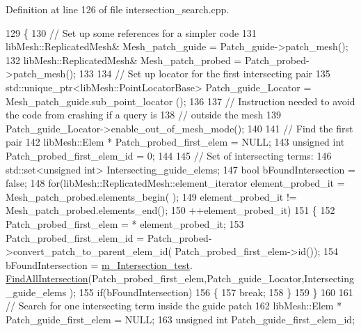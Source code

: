 Definition at line 126 of file intersection\+\_\+search.\+cpp.


\begin{DoxyCode}
129     \{
130         \textcolor{comment}{// Set up some references for a simpler code}
131         libMesh::ReplicatedMesh&    Mesh\_patch\_guide    = Patch\_guide->patch\_mesh();
132         libMesh::ReplicatedMesh&        Mesh\_patch\_probed   = Patch\_probed->patch\_mesh();
133 
134         \textcolor{comment}{// Set up locator for the first intersecting pair}
135         std::unique\_ptr<libMesh::PointLocatorBase> Patch\_guide\_Locator = Mesh\_patch\_guide.sub\_point\_locator
      ();
136 
137         \textcolor{comment}{// Instruction needed to avoid the code from crashing if a query is}
138         \textcolor{comment}{// outside the mesh}
139         Patch\_guide\_Locator->enable\_out\_of\_mesh\_mode();
140 
141         \textcolor{comment}{// Find the first pair}
142         libMesh::Elem * Patch\_probed\_first\_elem = NULL;
143         \textcolor{keywordtype}{unsigned} \textcolor{keywordtype}{int} Patch\_probed\_first\_elem\_id = 0;
144 
145         \textcolor{comment}{// Set of intersecting terms:}
146         std::set<unsigned int> Intersecting\_guide\_elems;
147         \textcolor{keywordtype}{bool} bFoundIntersection = \textcolor{keyword}{false};
148         \textcolor{keywordflow}{for}(libMesh::ReplicatedMesh::element\_iterator element\_probed\_it = Mesh\_patch\_probed.elements\_begin(
      );
149                  element\_probed\_it != Mesh\_patch\_probed.elements\_end();
150                  ++element\_probed\_it)
151         \{
152             Patch\_probed\_first\_elem = * element\_probed\_it;
153             Patch\_probed\_first\_elem\_id = Patch\_probed->convert\_patch\_to\_parent\_elem\_id(
      Patch\_probed\_first\_elem->id());
154             bFoundIntersection = \hyperlink{classcarl_1_1_intersection___search_afeedb5ff9144638151b7f956cf113fc4}{m\_Intersection\_test}.
      \hyperlink{classcarl_1_1_intersection___tools_a8238069bd83ef1029c6a5b60a188763b}{FindAllIntersection}(Patch\_probed\_first\_elem,Patch\_guide\_Locator,Intersecting\_guide\_elems
      );
155             \textcolor{keywordflow}{if}(bFoundIntersection)
156             \{
157                 \textcolor{keywordflow}{break};
158             \}
159         \}
160 
161         \textcolor{comment}{// Search for one intersecting term inside the guide patch}
162         libMesh::Elem * Patch\_guide\_first\_elem = NULL;
163         \textcolor{keywordtype}{unsigned} \textcolor{keywordtype}{int} Patch\_guide\_first\_elem\_id;

\end{DoxyCode}
